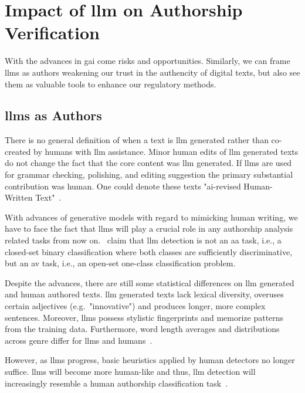 \section{Impact of \acs{llm} on Authorship Verification}

With the advances in \ac{gai} come risks and opportunities.
Similarly, we can frame \acp{llm} as authors weakening our trust in the authencity of digital texts, but also see them as valuable tools to enhance our regulatory methods.

\subsection{\acsp{llm} as Authors}
There is no general definition of when a text is \ac{llm} generated rather than co-created by humans with \ac{llm} assistance.
Minor human edits of \ac{llm} generated texts do not change the fact that the core content was \ac{llm} generated.
If \acp{llm} are used for grammar checking, polishing, and editing suggestion the primary substantial contribution was human.
One could denote these texts "\ac{ai}-revised Human-Written Text"~\citep{wang_stumbling_2024}.

With advances of generative models with regard to mimicking human writing, we have to face the fact that \acp{llm} will play a crucial role in any authorship analysis related tasks from now on.
\citet{llm_detection_av_2025}\ claim that \ac{llm} detection is not an \ac{aa} task, i.e., a closed-set binary classification where both classes are sufficiently discriminative, but an \ac{av} task, i.e., an open-set one-class classification problem. 

Despite the advances, there are still some statistical differences on \ac{llm} generated and human authored texts.
\ac{llm} generated texts lack lexical diversity, overuses certain adjectives (e.g.\ "innovative") and produces longer, more complex sentences.
Moreover, \acp{llm} possess stylistic fingerprints and memorize patterns from the training data.
Furthermore, word length averages and distributions across genre differ for \acp{llm} and humans~\citep{llm_detection_av_2025}.

However, as \acp{llm} progress, basic heuristics applied by human detectors no longer suffice.
\acp{llm} will become more human-like and thus, \ac{llm} detection will increasingly resemble a human authorship classification task~\citep{llm_detection_av_2025}.


